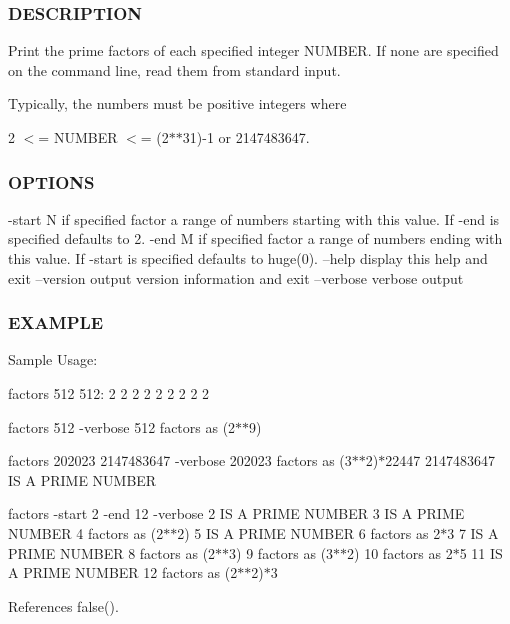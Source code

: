 \subsubsection*{D\+E\+S\+C\+R\+I\+P\+T\+I\+ON}

Print the prime factors of each specified integer N\+U\+M\+B\+ER. If none are specified on the command line, read them from standard input.

Typically, the numbers must be positive integers where

2 $<$= N\+U\+M\+B\+ER $<$= (2$\ast$$\ast$31)-\/1 or 2147483647.

\subsubsection*{O\+P\+T\+I\+O\+NS}

-\/start N if specified factor a range of numbers starting with this value. If -\/end is specified defaults to 2. -\/end M if specified factor a range of numbers ending with this value. If -\/start is specified defaults to huge(0). --help display this help and exit --version output version information and exit --verbose verbose output \subsubsection*{E\+X\+A\+M\+P\+LE}

Sample Usage\+:

factors 512 512\+: 2 2 2 2 2 2 2 2 2

factors 512 -\/verbose 512 factors as (2$\ast$$\ast$9)

factors 202023 2147483647 -\/verbose 202023 factors as (3$\ast$$\ast$2)$\ast$22447 2147483647 IS A P\+R\+I\+ME N\+U\+M\+B\+ER

factors -\/start 2 -\/end 12 -\/verbose 2 IS A P\+R\+I\+ME N\+U\+M\+B\+ER 3 IS A P\+R\+I\+ME N\+U\+M\+B\+ER 4 factors as (2$\ast$$\ast$2) 5 IS A P\+R\+I\+ME N\+U\+M\+B\+ER 6 factors as 2$\ast$3 7 IS A P\+R\+I\+ME N\+U\+M\+B\+ER 8 factors as (2$\ast$$\ast$3) 9 factors as (3$\ast$$\ast$2) 10 factors as 2$\ast$5 11 IS A P\+R\+I\+ME N\+U\+M\+B\+ER 12 factors as (2$\ast$$\ast$2)$\ast$3 

References false().

